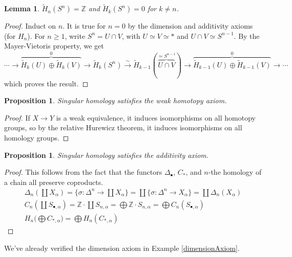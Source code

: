 \documentclass[12pt]{article}
\theoremstyle{plain}
\newtheorem{lemma}[equation]{Lemma}
\newtheorem{proposition}[equation]{Proposition}
\theoremstyle{definition}
\theoremstyle{remark}
\renewcommand{\H}{\widetilde H}
\newcommand{\ZZ}{\ensuremath{\mathbb{Z}}}
\begin{document}
 \begin{lemma}
   $\H_n(S^n)=\ZZ$ and $\H_k(S^n)=0$ for $k\neq n$.
 \end{lemma}
 \begin{proof}
   Induct on $n$. It is true for $n=0$ by the dimension and additivity axioms (for
   $H_n$). For $n\ge 1$, write $S^n=U\cap V$, with $U\simeq V\simeq \ast$ and $U\cap
   V\simeq S^{n-1}$. By the Mayer-Vietoris property, we get
   \[
    \cdots \to \overbrace{\H_k(U)\oplus \H_k(V)}^0 \to \H_k(S^n)\xrightarrow{\sim}
    \H_{k-1}(\overbrace{U\cap V}^{\simeq S^{n-1}}) \to \overbrace{\H_{k-1}(U)\oplus \H_{k-1}(V)}^0 \to \cdots
   \]
   which proves the result.
 \end{proof}
 \begin{proposition}
   Singular homology satisfies the weak homotopy axiom.
 \end{proposition}
 \begin{proof}
   If $X\to Y$ is a weak equivalence, it induces isomorphisms on all homotopy groups, so
   by the relative Hurewicz theorem, it induces isomorphisms on all homology groups.
 \end{proof}
 \begin{proposition}
   Singular homology satisfies the additivity axiom.
 \end{proposition}
 \begin{proof}
   This follows from the fact that the functors $\Delta_\bullet$, $C_*$, and $n$-the
   homology of a chain all preserve coproducts.
   \def\copd{{\textstyle\coprod}}
   \begin{gather*}
     \Delta_n(\copd X_\alpha) = \{\sigma:\Delta^n\to \copd
     X_\alpha\}=\copd\{\sigma:\Delta^n\to X_\alpha\} = \copd \Delta_n(X_\alpha)\\
     C_n(\copd S_{\bullet,\alpha}) = \ZZ\cdot \copd S_{n,\alpha} = \bigoplus \ZZ\cdot
     S_{n,\alpha} = \bigoplus C_n(S_{\bullet,\alpha})\\
     H_n\bigl( \bigoplus C_{*,\alpha}\bigr)  = \bigoplus H_n(C_{*,\alpha})
   \end{gather*}
 \end{proof}
 We've already verified the dimension axiom in Example \ref{dimensionAxiom}.
\end{document}
